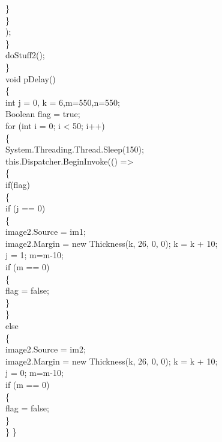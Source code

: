 {{                        \}\\                     
                \}\\);\\
            \}\\
            doStuff2();\\
        \}\\

        void pDelay()\\
        \{\\
            int j = 0, k = 6,m=550,n=550;\\
            Boolean flag = true;\\
           
            for (int i = 0; i < 50; i++)\\
            \{\\

                System.Threading.Thread.Sleep(150);\\

                this.Dispatcher.BeginInvoke(() =>\\
                \{\\
                    if(flag)\\
                    \{\\

                        if (j == 0)\\
                        \{\\
                            image2.Source = im1;\\
                            image2.Margin = new Thickness(k, 26, 0, 0); k = k + 10;\\
                            j = 1; m=m-10;\\
                            if (m == 0)\\
                            \{\\
                                flag = false;\\
                            \}\\


                        \}\\
                        else\\
                        \{\\
                            image2.Source = im2;\\
                            image2.Margin = new Thickness(k, 26, 0, 0); k = k + 10;\\
                            j = 0; m=m-10;\\
                            if (m == 0)\\
                            \{\\
                                flag = false;\\
                            \}\\
                        \}
                    \}


}}
